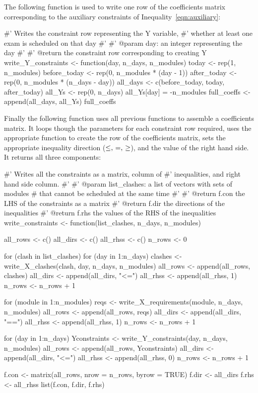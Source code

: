 The following function is used to write one row of the coefficients matrix
corresponding to the auxiliary constraints of Inequality~\ref{eqn:auxiliary}:

\begin{Rin-no-test}
#' Writes the constraint row representing the Y variable,
#' whether at least one exam is scheduled on that day
#'
#' @param day: an integer representing the day
#'
#' @return the constraint row corresponding to creating Y
write_Y_constraints <- function(day, n_days, n_modules){
  today <- rep(1, n_modules)
  before_today <- rep(0, n_modules * (day - 1))
  after_today <- rep(0, n_modules * (n_days - day))
  all_days <- c(before_today, today, after_today)
  all_Ys <- rep(0, n_days)
  all_Ys[day] = -n_modules
  full_coeffs <- append(all_days, all_Ys)
  full_coeffs
}
\end{Rin-no-test}

Finally the following function uses all previous functions
to assemble a coefficients matrix.
It loops though the parameters for each constraint row required, uses the
appropriate function to create the row of the coefficients matrix, sets the
appropriate inequality direction (\(\leq$, $=$, $\geq\)), and the value of the
right hand side.
It returns all three components:

\begin{Rin-no-test}
#' Writes all the constraints as a matrix, column of
#' inequalities, and right hand side column.
#'
#' @param list_clashes: a list of vectors with sets of modules
#         that cannot be scheduled at the same time
#'
#' @return f.con the LHS of the constraints as a matrix
#' @return f.dir the directions of the inequalities
#' @return f.rhs the values of the RHS of the inequalities
write_constraints <- function(list_clashes, n_days, n_modules){
  all_rows <- c()
  all_dirs <- c()
  all_rhss <- c()
  n_rows <- 0

  for (clash in list_clashes){
    for (day in 1:n_days){
      clashes <- write_X_clashes(clash, day, n_days, n_modules)
      all_rows <- append(all_rows, clashes)
      all_dirs <- append(all_dirs, "<=")
      all_rhss <- append(all_rhss, 1)
      n_rows <- n_rows + 1
    }
  }

  for (module in 1:n_modules){
    reqs <- write_X_requirements(module, n_days, n_modules)
    all_rows <- append(all_rows, reqs)
    all_dirs <- append(all_dirs, "==")
    all_rhss <- append(all_rhss, 1)
    n_rows <- n_rows + 1
  }

  for (day in 1:n_days){
    Yconstraints <- write_Y_constraints(day, n_days, n_modules)
    all_rows <- append(all_rows, Yconstraints)
    all_dirs <- append(all_dirs, "<=")
    all_rhss <- append(all_rhss, 0)
    n_rows <- n_rows + 1
  }

  f.con <- matrix(all_rows, nrow = n_rows, byrow = TRUE)
  f.dir <- all_dirs
  f.rhs <- all_rhss
  list(f.con, f.dir, f.rhs)
}
\end{Rin-no-test}

